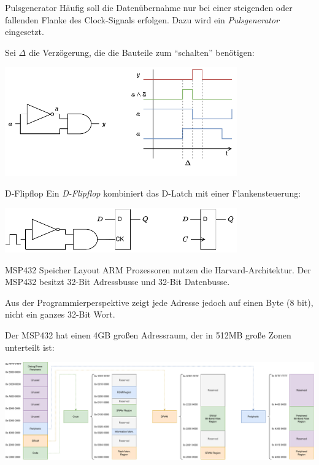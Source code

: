 \begin{defi}{Pulsgenerator}
    Häufig soll die Datenübernahme nur bei einer steigenden oder fallenden Flanke des Clock-Signals erfolgen.
    Dazu wird ein \emph{Pulsgenerator} eingesetzt.

    Sei $\Delta$ die Verzögerung, die die Bauteile zum \enquote{schalten} benötigen:

    \begin{center}
        \includegraphics[width=0.75\textwidth]{includes/figures/defi_pulsgenerator.pdf}
    \end{center}
\end{defi}

\begin{defi}{D-Flipflop}
    Ein \emph{D-Flipflop} kombiniert das D-Latch mit einer Flankensteuerung:

    \begin{center}
        \includegraphics[width=0.75\textwidth]{includes/figures/defi_d_flipflop.pdf}
    \end{center}
\end{defi}

\begin{defi}{MSP432 Speicher Layout}
    ARM Prozessoren nutzen die Harvard-Architektur.
    Der MSP432 besitzt 32-Bit Adressbusse und 32-Bit Datenbusse.

    Aus der Programmierperspektive zeigt jede Adresse jedoch auf einen Byte (8 bit), nicht ein ganzes 32-Bit Wort.

    Der MSP432 hat einen 4GB großen Adressraum, der in 512MB große Zonen unterteilt ist:

    \includegraphics[width=\textwidth]{includes/figures/defi_msp432_speicher.pdf}
\end{defi}

